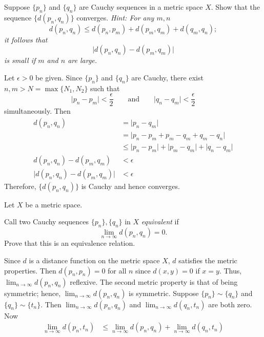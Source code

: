 \begin{exercise}
\item
  \label{3.23}
  Suppose \(\{p_n\}\) and \(\{q_n\}\) are Cauchy sequences in a metric space
  \(X\).
  Show that the sequence \(\{d(p_n,q_n)\}\) converges.
  \textit{Hint: For any \(m,n\)
    \[
    d(p_n, q_n)\leq d(p_n, p_m) + d(p_m, q_m) + d(q_m, q_n);
    \]
    it follows that
    \[
    \lvert d(p_n, q_n) - d(p_m, q_m)\rvert
    \]
    is small if \(m\) and \(n\) are large.}
  \par\smallskip
  Let \(\epsilon > 0\) be given.
  Since \(\{p_n\}\) and \(\{q_n\}\) are Cauchy, there exist
  \(n,m > N = \max\{N_1,N_2\}\) such that
  \[
  \lvert p_n - p_m\rvert < \frac{\epsilon}{2}\qquad\text{and}\qquad
  \lvert q_n - q_m\rvert < \frac{\epsilon}{2}
  \]
  simultaneously.
  Then
  \begin{align*}
    d(p_n, q_n) & = \lvert p_n - q_m\rvert\\
                & = \lvert p_n - p_m + p_m - q_m + q_m - q_n\rvert\\
                & \leq \lvert p_n - p_m\rvert + \lvert p_m - q_m\rvert +
                  \lvert q_n - q_m\rvert\\
    d(p_n, q_n) - d(p_m, q_m) & < \epsilon\\
    \lvert d(p_n, q_n) - d(p_m, q_m)\rvert & < \epsilon
  \end{align*}
  Therefore, \(\{d(p_n,q_n)\}\) is Cauchy and hence converges.
\item
  Let \(X\) be a metric space.
  \begin{exercise}[label = (\alph*), ref = \arabic{exercisei} (\alph*)]
  \item
    Call two Cauchy sequences \(\{p_n\},\{q_n\}\) in \(X\) \textit{equivalent}
    if
    \[
    \lim_{n\to\infty} d(p_n,q_n) = 0.
    \]
    Prove that this is an equivalence relation.
    \par\smallskip
    Since \(d\) is a distance function on the metric space \(X\), \(d\)
    satisfies the metric properties.
    Then \(d(p_n,p_n) = 0\) for all \(n\) since \(d(x,y) = 0\) if \(x = y\).
    Thus, \(\lim_{n\to\infty}d(p_n,q_n)\) reflexive.
    The second metric property is that of being symmetric; hence,
    \(\lim_{n\to\infty}d(p_n,q_n)\) is symmetric.
    Suppose \(\{p_n\}\sim\{q_n\}\) and \(\{q_n\}\sim\{t_n\}\).
    Then \(\lim_{n\to\infty}d(p_n,q_n)\) and \(\lim_{n\to\infty}d(q_n,t_n)\)
    are both zero.
    Now
    \begin{align*}
      \lim_{n\to\infty}d(p_n, t_n) & \leq \lim_{n\to\infty}d(p_n, q_n) +
                                     \lim_{n\to\infty}d(q_n, t_n)\\

\end{align*}
\end{exercise}
\end{exercise}
